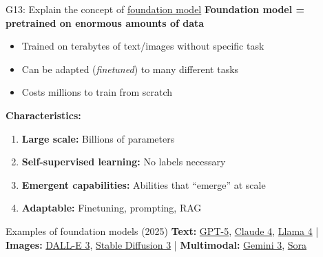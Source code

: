 \documentclass[aspectratio=169, 10pt]{beamer}
\begin{document}
\begin{frame}{G13: Explain the concept of \href{https://en.wikipedia.org/wiki/Foundation_model}{foundation model}}
    \textbf{Foundation model = pretrained on enormous amounts of data}
    \begin{itemize}
        \item Trained on terabytes of text/images without specific task
        \item Can be adapted (\textit{finetuned}) to many different tasks
        \item Costs millions to train from scratch
    \end{itemize}

    \vspace{0.2cm}
    \textbf{Characteristics:}
    \begin{enumerate}
        \item \textbf{Large scale:} Billions of parameters
        \item \textbf{Self-supervised learning:} No labels necessary
        \item \textbf{Emergent capabilities:} Abilities that ``emerge'' at scale
        \item \textbf{Adaptable:} Finetuning, prompting, RAG
    \end{enumerate}

    \vspace{0.15cm}
    \begin{block}{\footnotesize Examples of foundation models (2025)}
        \scriptsize
        \textbf{Text:} \href{https://openai.com/gpt-5}{GPT-5}, \href{https://www.anthropic.com/claude}{Claude 4}, \href{https://llama.meta.com/}{Llama 4} |
        \textbf{Images:} \href{https://openai.com/dall-e-3}{DALL-E 3}, \href{https://stability.ai/}{Stable Diffusion 3} |
        \textbf{Multimodal:} \href{https://deepmind.google/gemini}{Gemini 3}, \href{https://openai.com/sora}{Sora}
    \end{block}
\end{frame}
\end{document}
